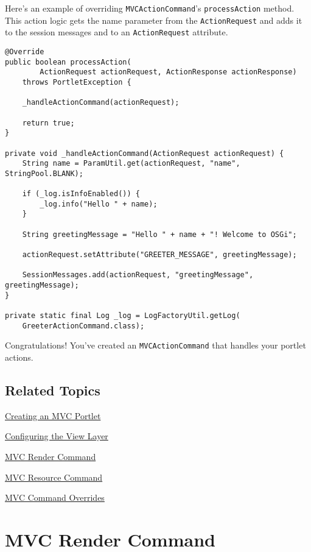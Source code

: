 \begin{enumerate}
  Here's an example of overriding \texttt{MVCActionCommand}'s
  \texttt{processAction} method. This action logic gets the name
  parameter from the \texttt{ActionRequest} and adds it to the session
  messages and to an \texttt{ActionRequest} attribute.

\begin{verbatim}
@Override
public boolean processAction(
        ActionRequest actionRequest, ActionResponse actionResponse)
    throws PortletException {

    _handleActionCommand(actionRequest);

    return true;
}

private void _handleActionCommand(ActionRequest actionRequest) {
    String name = ParamUtil.get(actionRequest, "name", StringPool.BLANK);

    if (_log.isInfoEnabled()) {
        _log.info("Hello " + name);
    }

    String greetingMessage = "Hello " + name + "! Welcome to OSGi";

    actionRequest.setAttribute("GREETER_MESSAGE", greetingMessage);

    SessionMessages.add(actionRequest, "greetingMessage", greetingMessage);
}

private static final Log _log = LogFactoryUtil.getLog(
    GreeterActionCommand.class);
\end{verbatim}
\end{enumerate}

Congratulations! You've created an \texttt{MVCActionCommand} that
handles your portlet actions.

\section{Related Topics}\label{related-topics-6}

\href{/docs/7-2/appdev/-/knowledge_base/a/creating-an-mvc-portlet}{Creating
an MVC Portlet}

\href{/docs/7-2/appdev/-/knowledge_base/a/configuring-the-view-layer}{Configuring
the View Layer}

\href{/docs/7-2/appdev/-/knowledge_base/a/mvc-render-command}{MVC Render
Command}

\href{/docs/7-2/appdev/-/knowledge_base/a/mvc-resource-command}{MVC
Resource Command}

\href{/docs/7-2/customization/-/knowledge_base/c/overriding-liferay-mvc-commands}{MVC
Command Overrides}

\chapter{MVC Render Command}\label{mvc-render-command}

